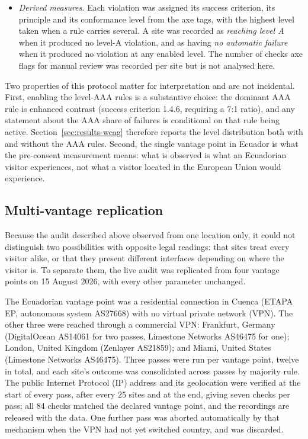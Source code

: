 \documentclass[pdflatex,sn-basic,Numbered,iicol]{sn-jnl}
\theoremstyle{thmstyleone}
\theoremstyle{thmstyletwo}
\theoremstyle{thmstylethree}
\begin{document}
\begin{itemize}
		\item \emph{Derived measures.} Each violation was assigned its success criterion, its principle and its conformance level from the axe tags, with the highest level taken when a rule carries several. A site was recorded as \emph{reaching level A} when it produced no level-A violation, and as having \emph{no automatic failure} when it produced no violation at any enabled level. The number of checks axe flags for manual review was recorded per site but is not analysed here.
	\end{itemize}
	
	Two properties of this protocol matter for interpretation and are not incidental. First, enabling the level-AAA rules is a substantive choice: the dominant AAA rule is enhanced contrast (success criterion 1.4.6, requiring a 7:1 ratio), and any statement about the AAA share of failures is conditional on that rule being active. Section~\ref{sec:results-wcag} therefore reports the level distribution both with and without the AAA rules. Second, the single vantage point in Ecuador is what the pre-consent measurement means: what is observed is what an Ecuadorian visitor experiences, not what a visitor located in the European Union would experience.
	
	\subsection{Multi-vantage replication}\label{sec:methods-vantage}
	
	Because the audit described above observed from one location only, it could not distinguish two possibilities with opposite legal readings: that sites treat every visitor alike, or that they present different interfaces depending on where the visitor is. To separate them, the live audit was replicated from four vantage points on 15 August 2026, with every other parameter unchanged.
	
	The Ecuadorian vantage point was a residential connection in Cuenca (ETAPA EP, autonomous system AS27668) with no virtual private network (VPN). The other three were reached through a commercial VPN: Frankfurt, Germany (DigitalOcean AS14061 for two passes, Limestone Networks AS46475 for one); London, United Kingdom (Zenlayer AS21859); and Miami, United States (Limestone Networks AS46475). Three passes were run per vantage point, twelve in total, and each site's outcome was consolidated across passes by majority rule. The public Internet Protocol (IP) address and its geolocation were verified at the start of every pass, after every 25 sites and at the end, giving seven checks per pass; all 84 checks matched the declared vantage point, and the recordings are released with the data. One further pass was aborted automatically by that mechanism when the VPN had not yet switched country, and was discarded.
	
\end{document}
